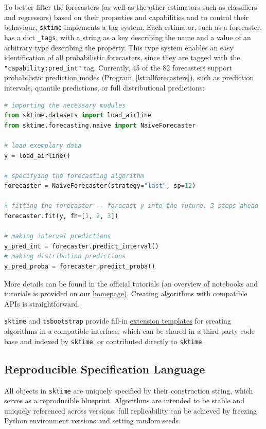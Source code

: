 To better filter the forecasters (as well as the other estimators such as classifiers and regressors) based on their properties and capabilities and to control their behaviour, \texttt{sktime} implements a tag system. Each estimator, such as a forecaster, has a dict \texttt{\_tags}, with a string as a key describing the name and a value of an arbitrary type describing the property.
This type system enables an easy identification of all probabilistic forecasters, since they are tagged with the \texttt{"capability:pred\_int"} tag. Currently, 45 of the 82 forecasters support probabilistic prediction modes (Program~\ref{lst:allforecasters}), such as prediction intervals, quantile predictions, or full distributional predictions:

\begin{lstlisting}[language=Python, caption=Exemplary probabilistic forecast with NaiveForecaster, label=lst:probabilisticforecast]
# importing the necessary modules
from sktime.datasets import load_airline
from sktime.forecasting.naive import NaiveForecaster

# load exemplary data
y = load_airline()

# specifying the forecasting algorithm
forecaster = NaiveForecaster(strategy="last", sp=12)

# fitting the forecaster -- forecast y into the future, 3 steps ahead
forecaster.fit(y, fh=[1, 2, 3])

# making interval predictions
y_pred_int = forecaster.predict_interval()
# making distribution predictions
y_pred_proba = forecaster.predict_proba()
\end{lstlisting}

More details can be found in the official tutorials (an overview of notebooks and tutorials is provided on our \href{https://www.sktime.net/en/latest/users.html}{homepage}).
Creating algorithms with compatible APIs is straightforward.

\texttt{sktime} and \texttt{tsbootstrap} provide fill-in \href{https://github.com/sktime/sktime/tree/main/extension_templates}{extension templates} for creating algorithms in a compatible interface, which can be shared in a third-party code base and indexed by \texttt{sktime}, or contributed directly to \texttt{sktime}.

\subsection{Reproducible Specification Language}
All objects in \texttt{sktime} are uniquely specified by their construction string, which serves as a reproducible blueprint. Algorithms are intended to be stable and uniquely referenced across versions; full replicability can be achieved by freezing Python environment versions and setting random seeds.

